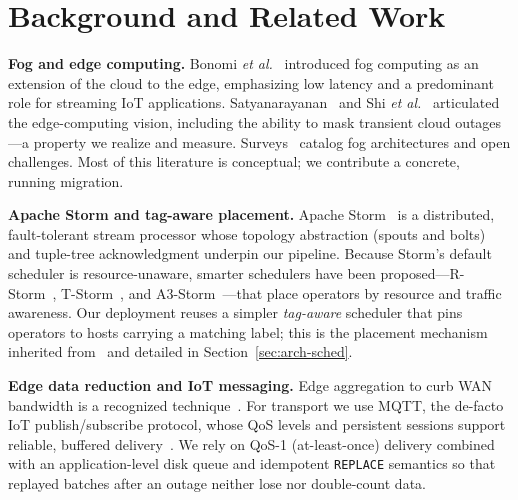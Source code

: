 \documentclass[conference]{IEEEtran}
\newcommand{\code}[1]{\texttt{#1}}
\begin{document}
\section{Background and Related Work}\label{sec:related}
\textbf{Fog and edge computing.}
Bonomi \textit{et al.}~\cite{bonomi2012,bonomi2014} introduced fog computing as
an extension of the cloud to the edge, emphasizing low latency and a predominant
role for streaming IoT applications. Satyanarayanan~\cite{satyanarayanan2017} and
Shi \textit{et al.}~\cite{shi2016} articulated the edge-computing vision,
including the ability to mask transient cloud outages---a property we realize and
measure. Surveys~\cite{naha2018,yousefpour2019,hong2019} catalog fog
architectures and open challenges. Most of this literature is conceptual; we
contribute a concrete, running migration.

\textbf{Apache Storm and tag-aware placement.}
Apache Storm~\cite{stormtwitter} is a distributed, fault-tolerant stream
processor whose topology abstraction (spouts and bolts) and tuple-tree
acknowledgment underpin our pipeline. Because Storm's default scheduler is
resource-unaware, smarter schedulers have been
proposed---R-Storm~\cite{rstorm}, T-Storm~\cite{tstorm}, and
A3-Storm~\cite{a3storm}---that place operators by resource and traffic awareness.
Our deployment reuses a simpler \emph{tag-aware} scheduler that pins operators to
hosts carrying a matching label; this is the placement mechanism inherited
from~\cite{pham2021} and detailed in Section~\ref{sec:arch-sched}.

\textbf{Edge data reduction and IoT messaging.}
Edge aggregation to curb WAN bandwidth is a recognized
technique~\cite{abdullah2021}. For transport we use MQTT, the de-facto IoT
publish/subscribe protocol, whose QoS levels and persistent sessions support
reliable, buffered delivery~\cite{dizdarevic2019,naik2017}. We rely on QoS-1
(at-least-once) delivery combined with an application-level disk queue and
idempotent \code{REPLACE} semantics so that replayed batches after an outage
neither lose nor double-count data.
\end{document}
